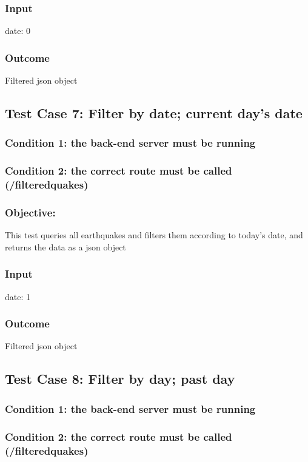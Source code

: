\subsubsection{Input}
{date: 0}
\subsubsection{Outcome}
Filtered json object


\subsection{Test Case 7: Filter by date; current day's date}

\subsubsection{Condition 1: the back-end server must be running}
\subsubsection{Condition 2: the correct route must be called (/filteredquakes)}
\subsubsection{Objective: } This test queries all earthquakes and filters them according to today's date, and returns the data as a json object
\subsubsection{Input}
{date: 1}
\subsubsection{Outcome}
Filtered json object


\subsection{Test Case 8: Filter by day; past day}

\subsubsection{Condition 1: the back-end server must be running}
\subsubsection{Condition 2: the correct route must be called (/filteredquakes)}
